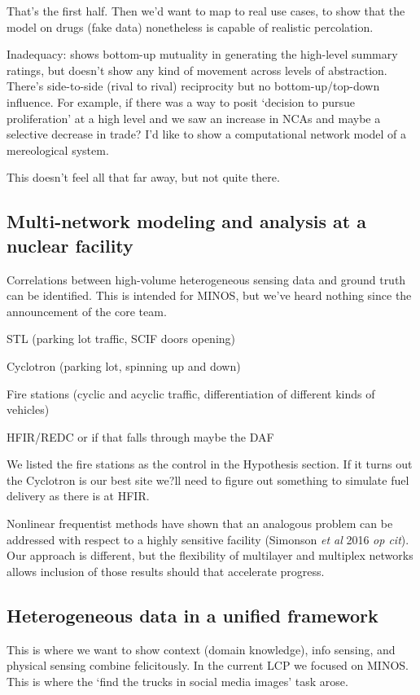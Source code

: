 \documentclass{article} %
\begin{document}
That's the first half. Then we'd want to map to real use cases, to show that the model on drugs (fake data) nonetheless is capable of realistic percolation. 

Inadequacy: shows bottom-up mutuality in generating the high-level summary ratings, but doesn't show any kind of movement across levels of abstraction. There's side-to-side (rival to rival) reciprocity but no bottom-up/top-down influence. For example, if there was a way to posit `decision to pursue proliferation' at a high level and we saw an increase in NCAs and maybe a selective decrease in trade? I'd like to show a computational network model of a mereological system.

{\color {red} This doesn't feel all that far away, but not quite there.}

\subsection{Multi-network modeling and analysis at a nuclear facility}
Correlations between high-volume heterogeneous sensing data and ground truth can be identified. This is intended for MINOS, but we've heard nothing since the announcement of the core team.

\begin{enumerate*}
\item STL (parking lot traffic, SCIF doors opening)
\item Cyclotron (parking lot, spinning up and down)
\item Fire stations (cyclic and acyclic traffic, differentiation of different kinds of vehicles)
\item HFIR/REDC or if that falls through maybe the DAF
\end{enumerate*}

We listed the fire stations as the control in the Hypothesis section. If it turns out the Cyclotron is our best site we?ll need to figure out something to simulate fuel delivery as there is at HFIR. 

Nonlinear frequentist methods have shown that an analogous problem can be addressed with respect to a highly sensitive facility (Simonson \textit{et al} 2016 \textit{op cit}). Our approach is different, but the flexibility of multilayer and multiplex networks allows inclusion of those results should that accelerate progress.

\subsection{Heterogeneous data in a unified framework}
This is where we want to show context (domain knowledge), info sensing, and physical sensing combine felicitously. In the current LCP we focused on MINOS. This is where the `find the trucks in social media images' task arose. 
\end{document}
